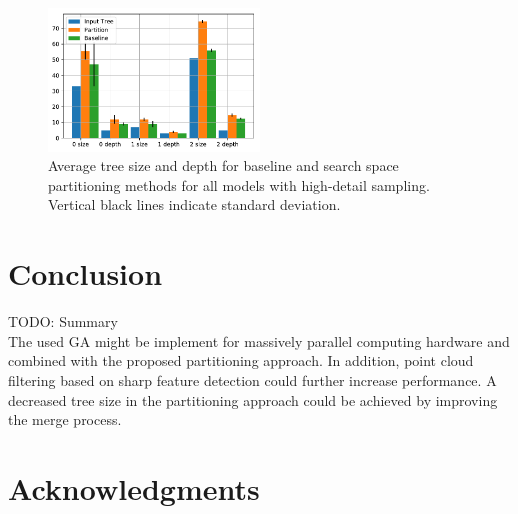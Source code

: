 \begin{figure}[htb]
	\centering
	\includegraphics[width=0.5\textwidth]{figures/g2.pdf}
	\caption{Average tree size and depth for baseline and search space partitioning methods for all models with high-detail sampling. Vertical black lines indicate standard deviation.}
	\label{fig:graph2}
\end{figure}
\section{Conclusion}
TODO: Summary
\\
The used \ac{GA} might be implement for massively parallel computing hardware and combined with the proposed partitioning approach. 
In addition, point cloud filtering based on sharp feature detection \cite{weber2010sharp} could further increase performance.
A decreased tree size in the partitioning approach could be achieved by improving the merge process.



\section{Acknowledgments}



%
%

